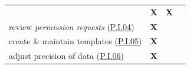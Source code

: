 \documentclass[12pt,english,a4paper,titlepage,cleardoublepage=empty,dottedtoc]{report}
\begin{document}
\begin{longtable}[]{@{}lccc@{}}
\begin{minipage}[t]{0.24\columnwidth}
\end{minipage} & \begin{minipage}[t]{0.24\columnwidth}\centering\strut
\textbf{X}\strut
\end{minipage} & \begin{minipage}[t]{0.24\columnwidth}\centering\strut
\textbf{X}\strut
\end{minipage} & \begin{minipage}[t]{0.24\columnwidth}\centering\strut
\strut
\end{minipage}\tabularnewline
\begin{minipage}[t]{0.24\columnwidth}\raggedright\strut
review \emph{permission requests}
(\protect\hyperlink{pi04}{P.I.04})\strut
\end{minipage} & \begin{minipage}[t]{0.24\columnwidth}\centering\strut
\textbf{X}\strut
\end{minipage} & \begin{minipage}[t]{0.24\columnwidth}\centering\strut
\strut
\end{minipage} & \begin{minipage}[t]{0.24\columnwidth}\centering\strut
\strut
\end{minipage}\tabularnewline
\begin{minipage}[t]{0.24\columnwidth}\raggedright\strut
create \& maintain templates (\protect\hyperlink{pi05}{P.I.05})\strut
\end{minipage} & \begin{minipage}[t]{0.24\columnwidth}\centering\strut
\textbf{X}\strut
\end{minipage} & \begin{minipage}[t]{0.24\columnwidth}\centering\strut
\strut
\end{minipage} & \begin{minipage}[t]{0.24\columnwidth}\centering\strut
\strut
\end{minipage}\tabularnewline
\begin{minipage}[t]{0.24\columnwidth}\raggedright\strut
adjust precision of data (\protect\hyperlink{pi06}{P.I.06})\strut
\end{minipage} & \begin{minipage}[t]{0.24\columnwidth}\centering\strut
\textbf{X}\strut
\end{minipage} & \begin{minipage}[t]{0.24\columnwidth}\centering\strut
\strut
\end{minipage} & \begin{minipage}[t]{0.24\columnwidth}\centering\strut

\end{minipage}
\end{longtable}
\end{document}
